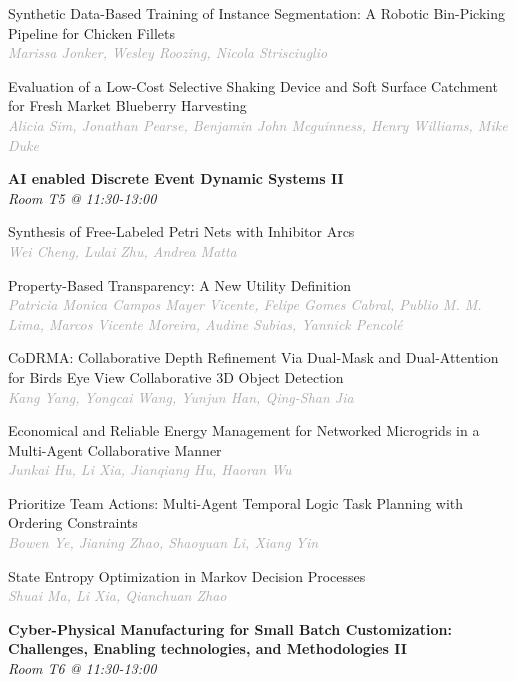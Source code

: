 \begin{multicols*}{2}
\small Synthetic Data-Based Training of Instance Segmentation: A Robotic Bin-Picking Pipeline for Chicken Fillets\\ 
\footnotesize \textcolor{darkgray}{\textit{Marissa Jonker, Wesley  Roozing, Nicola  Strisciuglio}}

\small Evaluation of a Low-Cost Selective Shaking Device and Soft Surface Catchment for Fresh Market Blueberry Harvesting\\ 
\footnotesize \textcolor{darkgray}{\textit{Alicia Sim, Jonathan  Pearse, Benjamin John  Mcguinness, Henry  Williams, Mike  Duke}}

\normalsize \textbf{AI enabled Discrete Event Dynamic Systems II}\\
\small \textit{Room T5 @ 11:30-13:00}

\small Synthesis of Free-Labeled Petri Nets with Inhibitor Arcs\\ 
\footnotesize \textcolor{darkgray}{\textit{Wei Cheng, Lulai  Zhu, Andrea  Matta}}

\small Property-Based Transparency: A New Utility Definition\\ 
\footnotesize \textcolor{darkgray}{\textit{Patricia Monica Campos Mayer Vicente, Felipe Gomes  Cabral, Publio M. M.  Lima, Marcos Vicente  Moreira, Audine  Subias, Yannick  Pencolé}}

\small CoDRMA: Collaborative Depth Refinement Via Dual-Mask and Dual-Attention for Birds Eye View Collaborative 3D Object Detection\\ 
\footnotesize \textcolor{darkgray}{\textit{Kang Yang, Yongcai  Wang, Yunjun  Han, Qing-Shan  Jia}}

\small Economical and Reliable Energy Management for Networked Microgrids in a Multi-Agent Collaborative Manner\\ 
\footnotesize \textcolor{darkgray}{\textit{Junkai Hu, Li  Xia, Jianqiang  Hu, Haoran  Wu}}

\small Prioritize Team Actions: Multi-Agent Temporal Logic Task Planning with Ordering Constraints\\ 
\footnotesize \textcolor{darkgray}{\textit{Bowen Ye, Jianing  Zhao, Shaoyuan  Li, Xiang  Yin}}

\small State Entropy Optimization in Markov Decision Processes\\ 
\footnotesize \textcolor{darkgray}{\textit{Shuai Ma, Li  Xia, Qianchuan  Zhao}}

\normalsize \textbf{Cyber-Physical Manufacturing for Small Batch Customization: Challenges, Enabling technologies, and Methodologies II}\\
\small \textit{Room T6 @ 11:30-13:00}


\end{multicols*}
